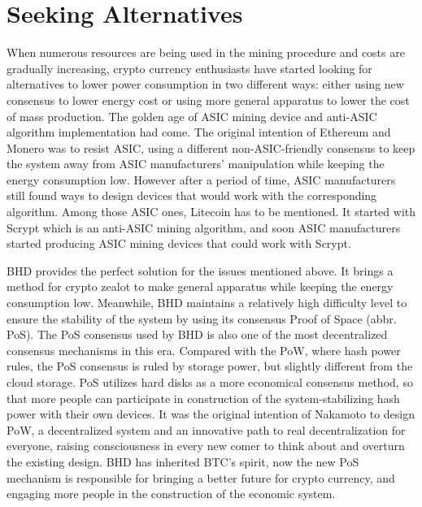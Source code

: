 \section{Seeking Alternatives}
\begin{flushleft}
    When numerous resources are being used in the mining procedure and costs are gradually increasing, crypto currency enthusiasts have started looking for alternatives to lower power consumption in two different ways: either using new consensus to lower energy cost or using more general apparatus to lower the cost of mass production. The golden age of ASIC mining device and anti-ASIC algorithm implementation had come. The original intention of Ethereum and Monero was to resist ASIC, using a different non-ASIC-friendly consensus to keep the system away from ASIC manufacturers’ manipulation while keeping the energy consumption low. However after a period of time, ASIC manufacturers still found ways to design devices that would work with the corresponding algorithm. Among those ASIC ones, Litecoin has to be mentioned. It started with Scrypt which is an anti-ASIC mining algorithm, and soon ASIC manufacturers started producing ASIC mining devices that could work with Scrypt.
\end{flushleft}
\begin{flushleft}
    BHD provides the perfect solution for the issues mentioned above. It brings a method for crypto zealot to make general apparatus while keeping the energy consumption low. Meanwhile, BHD maintains a relatively high difficulty level to ensure the stability of the system by using its consensus Proof of Space (abbr. PoS). The PoS consensus used by BHD is also one of the most decentralized consensus mechanisms in this era. Compared with the PoW, where hash power rules, the PoS consensus is ruled by storage power, but slightly different from the cloud storage. PoS utilizes hard disks as a more economical consensus method, so that more people can participate in construction of the system-stabilizing hash power with their own devices. It was the original intention of Nakamoto to design PoW, a decentralized system and an innovative path to real decentralization for everyone, raising consciousness in every new comer to think about and overturn the existing design. BHD has inherited BTC’s spirit, now the new PoS mechanism is responsible for bringing a better future for crypto currency, and engaging more people in the construction of the economic system.
\end{flushleft}
